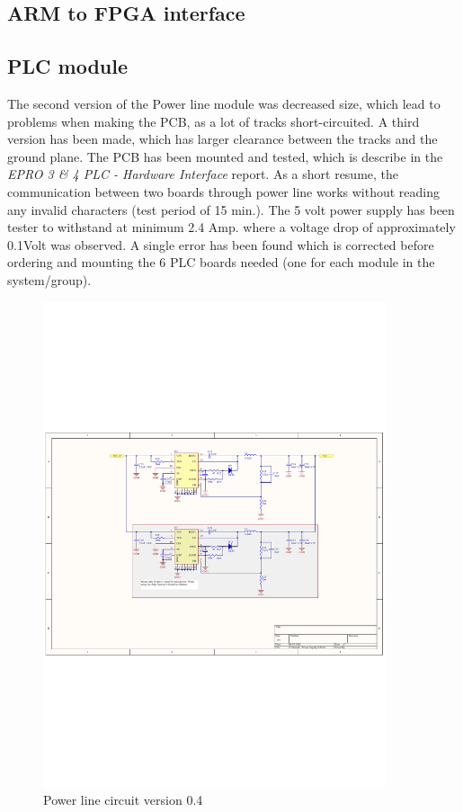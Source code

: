 \subsection{ARM to FPGA interface}



\subsection{PLC module}
The second version of the Power line module was decreased size, which lead to problems when making the PCB, as a lot of tracks short-circuited. A third version has been made, which has larger clearance between the tracks and the ground plane. The PCB has been mounted and tested, which is describe in the \textit{EPRO 3 \& 4 PLC - Hardware Interface} report. As a short resume, the communication between two boards through power line works without reading any invalid characters (test period of 15 min.). The 5 volt power supply has been tester to withstand at minimum 2.4 Amp. where a voltage drop of approximately 0.1Volt was observed. 
A single error has been found which is corrected before ordering and mounting the 6 PLC boards needed (one for each module in the system/group).

\begin{figure}[H]
	\begin{centering}
		 \includegraphics[width=0.9\textwidth,page=1,angle=0]{images/SIG60_v0_4}
		\caption{Power line circuit version 0.4}
	\end{centering}
\end{figure}

